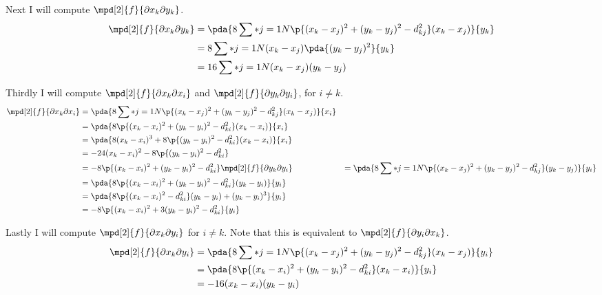 \documentclass[11pt, oneside]{article}
\begin{document}
\begin{enumerate}
\begin{enumerate}
        Next I will compute $\mpd[2]{f}{\partial x_k \partial y_k}$.
        \begin{align*}
          \mpd[2]{f}{\partial x_k \partial y_k} &= \pda{8 \sum*{j = 1}{N}{\p{(x_k - x_j)^2 + (y_k - y_j)^2 - d_{kj}^2}(x_k - x_j)}}{y_k} \\
          &= 8 \sum*{j = 1}{N}{(x_k - x_j)\pda{(y_k - y_j)^2}{y_k}} \\
          &= 16 \sum*{j = 1}{N}{(x_k - x_j)(y_k - y_j)}
        \end{align*}

        Thirdly I will compute $\mpd[2]{f}{\partial x_k \partial x_i}$ and
        $\mpd[2]{f}{\partial y_k \partial y_i}$, for $i \neq k$.
        \begin{align*}
          \mpd[2]{f}{\partial x_k \partial x_i} &= \pda{8 \sum*{j = 1}{N}{\p{(x_k - x_j)^2 + (y_k - y_j)^2 - d_{kj}^2}(x_k - x_j)}}{x_i} \\
          &= \pda{8\p{(x_k - x_i)^2 + (y_k - y_i)^2 - d_{ki}^2}(x_k - x_i)}{x_i} \\
          &= \pda{8(x_k - x_i)^3 +8\p{(y_k - y_i)^2 - d_{ki}^2}(x_k - x_i)}{x_i} \\
          &= -24(x_k - x_i)^2 - 8\p{(y_k - y_i)^2 - d_{ki}^2} \\
          &= -8\p{(x_k - x_i)^2 + (y_k - y_i)^2 - d_{ki}^2}
          \mpd[2]{f}{\partial y_k \partial y_i} &= \pda{8 \sum*{j = 1}{N}{\p{(x_k - x_j)^2 + (y_k - y_j)^2 - d_{kj}^2}(y_k - y_j)}}{y_i} \\
          &= \pda{8 \p{(x_k - x_i)^2 + (y_k - y_i)^2 - d_{ki}^2}(y_k - y_i)}{y_i} \\
          &= \pda{8 \p{(x_k - x_i)^2 - d_{ki}^2}(y_k - y_i)+ (y_k - y_i)^3}{y_i} \\
          &= -8 \p{(x_k - x_i)^2 + 3(y_k - y_i)^2 - d_{ki}^2}{y_i} \\
        \end{align*}

        Lastly I will compute $\mpd[2]{f}{\partial x_k \partial y_i}$ for
        $i \neq k$.
        Note that this is equivalent to $\mpd[2]{f}{\partial y_i \partial x_k}$.
        \begin{align*}
          \mpd[2]{f}{\partial x_k \partial y_i} &= \pda{8 \sum*{j = 1}{N}{\p{(x_k - x_j)^2 + (y_k - y_j)^2 - d_{kj}^2}(x_k - x_j)}}{y_i} \\
          &= \pda{8 \p{(x_k - x_i)^2 + (y_k - y_i)^2 - d_{ki}^2}(x_k - x_i)}{y_i} \\
          &= -16(x_k - x_i)(y_k - y_i) \\
        \end{align*}


\end{enumerate}
\end{enumerate}
\end{document}
